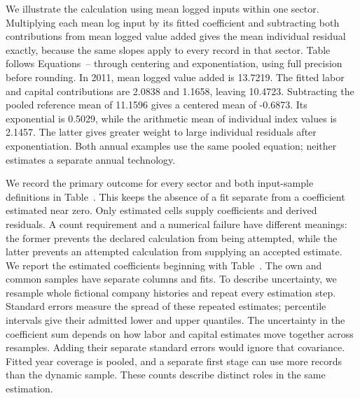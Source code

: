 We illustrate the calculation using mean logged inputs within one sector. Multiplying each mean log input by its fitted coefficient and subtracting both contributions from mean logged value added gives the mean individual residual exactly, because the same slopes apply to every record in that sector. Table~ follows Equations~-- through centering and exponentiation, using full precision before rounding.
In 2011, mean logged value added is 13.7219. The fitted labor and capital contributions are 2.0838 and 1.1658, leaving 10.4723. Subtracting the pooled reference mean of 11.1596 gives a centered mean of -0.6873. Its exponential is 0.5029, while the arithmetic mean of individual index values is 2.1457. The latter gives greater weight to large individual residuals after exponentiation. Both annual examples use the same pooled equation; neither estimates a separate annual technology.


We record the primary outcome for every sector and both input-sample definitions in Table~. This keeps the absence of a fit separate from a coefficient estimated near zero.
Only estimated cells supply coefficients and derived residuals. A count requirement and a numerical failure have different meanings: the former prevents the declared calculation from being attempted, while the latter prevents an attempted calculation from supplying an accepted estimate.
We report the estimated coefficients beginning with Table~. The own and common samples have separate columns and fits. To describe uncertainty, we resample whole fictional company histories and repeat every estimation step. Standard errors measure the spread of these repeated estimates; percentile intervals give their admitted lower and upper quantiles.
The uncertainty in the coefficient sum depends on how labor and capital estimates move together across resamples. Adding their separate standard errors would ignore that covariance. Fitted year coverage is pooled, and a separate first stage can use more records than the dynamic sample. These counts describe distinct roles in the same estimation.

